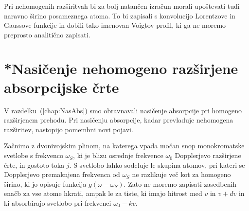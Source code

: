 \begin{remark}
Pri nehomogenih razširitvah bi za bolj natančen izračun morali upoštevati 
tudi naravno širino posameznega atoma. To bi zapisali s konvolucijo Lorentzove
in Gaussove funkcije in dobili tako imenovan Voigtov 
profil, ki ga ne moremo preprosto analitično zapisati.
\end{remark}

\section{*Nasičenje nehomogeno razširjene absorpcijske črte}
\label{NasabsNehom}
V razdelku~(\ref{chap:NasAbs}) smo obravnavali nasičenje absorpcije pri homogeno 
razširjenem prehodu. Pri nasičenju absorpcije, kadar prevladuje nehomogena razširitev,
nastopijo pomembni novi pojavi.

Začnimo z dvonivojskim plinom, na katerega 
vpada močan snop monokromatske svetlobe s frekvenco $\omega_S$,
ki je blizu osrednje frekvence $\omega_{0}$ Dopplerjevo razširjene 
črte, in gostoto toka $j$. S svetlobo
lahko sodeluje le skupina atomov, pri kateri se Dopplerjevo premaknjena
frekvenca od $\omega_S$ ne razlikuje več kot za homogeno širino, ki
jo opisuje funkcija $g(\omega-\omega_S)$. Zato ne moremo zapisati zasedbenih
enačb za vse atome hkrati, ampak le za tiste, ki imajo hitrost med
$v$ in $v+dv$ in ki absorbirajo svetlobo pri frekvenci $\omega_{0}-kv$.

